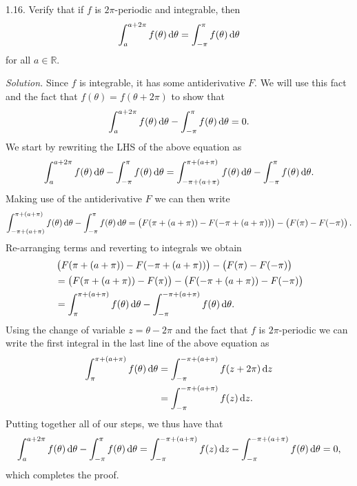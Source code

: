 \documentclass{article}
\newcommand{\R}{\mathbb{R}}
\begin{document}
\newpage

1.16. Verify that if $f$ is $2\pi$-periodic and integrable, then
%
\begin{equation*}
    \int_a^{a + 2 \pi} f(\theta) \dif \theta = \int_{-\pi}^\pi f(\theta) \dif \theta
\end{equation*}
%
for all $a \in \R$.

\textit{Solution.} Since $f$ is integrable, it has some antiderivative
$F$. We will use this fact and the fact that $f(\theta) = f(\theta + 2
\pi)$ to show that
%
\begin{equation*}
    \int_a^{a + 2 \pi} f(\theta) \dif \theta - \int_{-\pi}^\pi f(\theta) \dif \theta = 0
    .
\end{equation*}
%
We start by rewriting the LHS of the above equation as
%
\begin{equation*}
    \int_a^{a + 2 \pi} f(\theta) \dif \theta - \int_{-\pi}^\pi f(\theta) \dif \theta
    =
    \int_{-\pi + (a + \pi)}^{\pi + (a + \pi)} f(\theta) \dif \theta - \int_{-\pi}^\pi f(\theta) \dif \theta
    .
\end{equation*}
%
Making use of the antiderivative $F$ we can then write
%
\begin{equation*}
    \int_{-\pi + (a + \pi)}^{\pi + (a + \pi)} f(\theta) \dif \theta - \int_{-\pi}^\pi f(\theta) \dif \theta
    =
    \del{F(\pi + (a + \pi)) - F(-\pi + (a + \pi))}
    -
    \del{F(\pi) - F(-\pi)}
    .
\end{equation*}
%
Re-arranging terms and reverting to integrals we obtain
%
\begin{align*}
    &\del{F(\pi + (a + \pi)) - F(-\pi + (a + \pi))}
    -
    \del{F(\pi) - F(-\pi)}
    \\
    &=
    \del{F(\pi + (a + \pi)) - F(\pi)}
    -
    \del{F(- \pi + (a + \pi)) - F(-\pi)}
    \\
    &=
    \int_{\pi}^{\pi + (a + \pi)} f(\theta) \dif \theta - \int_{-\pi}^{-\pi + (a + \pi)} f(\theta) \dif \theta
    .
\end{align*}
%
Using the change of variable $z = \theta - 2 \pi$ and the fact that $f$
is $2 \pi$-periodic we can write the first integral in the last line of
the above equation as
%
\begin{align*}
    \int_{\pi}^{\pi + (a + \pi)} f(\theta) \dif \theta
    &= \int_{- \pi}^{-\pi + (a + \pi)} f(z + 2 \pi) \dif z \\
    &= \int_{- \pi}^{-\pi + (a + \pi)} f(z) \dif z
    .
\end{align*}
%
Putting together all of our steps, we thus have that
%
\begin{equation*}
    \int_a^{a + 2 \pi} f(\theta) \dif \theta - \int_{-\pi}^\pi f(\theta) \dif \theta
    =
    \int_{- \pi}^{-\pi + (a + \pi)} f(z) \dif z
    - \int_{-\pi}^{-\pi + (a + \pi)} f(\theta) \dif \theta
    = 0
    ,
\end{equation*}
%
which completes the proof.
\end{document}
